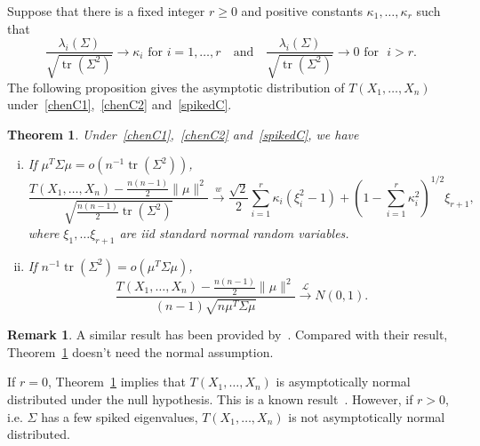 \documentclass[3p]{elsarticle}
\DeclareMathOperator{\mytr}{tr}
\theoremstyle{plain}
\newtheorem{theorem}{\quad\quad Theorem}
\theoremstyle{definition}
\newtheorem{remark}{\quad\quad Remark}
\theoremstyle{remark}
\begin{document}
Suppose that there is a fixed integer $r\geq 0$ and positive constants $\kappa_1,\ldots,\kappa_r$ such that
\begin{equation}\label{spikedC}
    \frac{\lambda_{i}(\Sigma)}{\sqrt{\mytr(\Sigma^2)}}\to \kappa_i \text{ for } i=1,\ldots, r
    \quad
    \text{and}
    \quad
    \frac{\lambda_{i}(\Sigma)}{\sqrt{\mytr(\Sigma^2)}}\to 0 \text{ for }\,\, i> r.
\end{equation}
The following proposition gives the asymptotic distribution of $T(X_1,\ldots,X_n)$ under~\eqref{chenC1},~\eqref{chenC2} and~\eqref{spikedC}.
\begin{theorem}\label{prop:spiked1}
    Under~\eqref{chenC1},~\eqref{chenC2} and~\eqref{spikedC},
    we have
    \begin{enumerate}[(i)]
        \item
If $\mu^T \Sigma \mu=o(n^{-1}\mytr(\Sigma^2))$,
    $$
    \frac{T(X_1,\ldots,X_n)-\frac{n(n-1)}{2}\|\mu\|^2}{\sqrt{\frac{n(n-1)}{2}\mytr(\Sigma^2)}}
    \xrightarrow{w}
            \frac{\sqrt{2}}{2}\sum_{i=1}^r \kappa_i (\xi_i^2-1)+(1-\sum_{i=1}^r \kappa_i^2)^{1/2} \xi_{r+1},
    $$
            where $\xi_1,\ldots \xi_{r+1}$ are iid standard normal random variables.
\item
If $n^{-1}\mytr(\Sigma^2)=o(\mu^T \Sigma \mu)$,
$$
            \frac{T(X_1,\ldots,X_n)-\frac{n(n-1)}{2}\|\mu\|^2}{(n-1)\sqrt{n\mu^T \Sigma \mu}}\xrightarrow{\mathcal{L}}N(0,1).
            $$
    \end{enumerate}
\end{theorem}
\begin{remark}
    A similar result has been provided by~\citet[Theorem 3.1]{KATAYAMA2013410}.
    Compared with their result, Theorem~\ref{prop:spiked1} doesn't need the normal assumption.
\end{remark}

    If $r=0$, Theorem~\ref{prop:spiked1} implies that $T(X_1,\ldots, X_n)$ is asymptotically normal distributed under the null hypothesis. This is a known result~\citep[Theorem 1]{Chen2010A}.
    However, if $r>0$, i.e. $\Sigma$ has a few spiked eigenvalues, $T(X_1,\ldots,X_n)$ is not asymptotically normal distributed.
\end{document}
